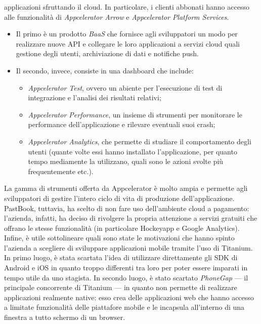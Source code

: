 				applicazioni sfruttando il cloud. In particolare, i clienti abbonati hanno accesso alle funzionalità di
				\emph{Appcelerator Arrow} e \emph{Appcelerator Platform Services}.
				\begin{itemize}
					\item Il primo è un prodotto \emph{BaaS} che fornisce agli sviluppatori un modo per realizzare nuove API e
					collegare le loro applicazioni a servizi cloud quali gestione degli utenti, archiviazione di dati e
					notifiche push.
					\item Il secondo, invece, consiste in una dashboard che include:
					\begin{itemize}
						\item \emph{Appcelerator Test}, ovvero un abiente per l'esecuzione di test di integrazione e
						l'analisi dei risultati relativi;
						\item \emph{Appcelerator Performance}, un insieme di strumenti per monitorare le performance
						dell'applicazione e rilevare eventuali suoi crash;
						\item \emph{Appcelerator Analytics}, che permette di studiare il comportamento degli utenti (quante
						volte essi hanno installato l'applicazione, per quanto tempo mediamente la utilizzano, quali sono
						le azioni svolte più frequentemente etc.).
					\end{itemize}
				\end{itemize}
				La gamma di strumenti offerta da Appcelerator è molto ampia e permette agli sviluppatori di gestire l'intero ciclo di
				vita di produzione dell'applicazione. PastBook, tuttavia, ha scelto di non fare uso dell'ambiente cloud a pagamento:
				l'azienda, infatti, ha deciso di rivolgere la propria attenzione a servizi gratuiti che offrano le stesse
				funzionalità (in particolare Hockeyapp e Google Analytics).\\
				Infine, è utile sottolineare quali sono state le motivazioni che hanno spinto l'azienda a scegliere di sviluppare
				applicazioni mobile tramite l'uso di Titanium. In primo luogo, è stata scartata l'idea di utilizzare direttamente gli
				SDK di Android e iOS in quanto troppo differenti tra loro per poter essere imparati in tempo utile da uno stagista.
				In secondo luogo, è stato scartato \emph{PhoneGap} — il principale concorrente di Titanium — in quanto non permette
				di realizzare applicazioni realmente native: esso crea delle applicazioni web che hanno accesso a limitate
				funzionalità delle piattafore mobile e le incapsula all'interno di una finestra a tutto schermo di un browser.
